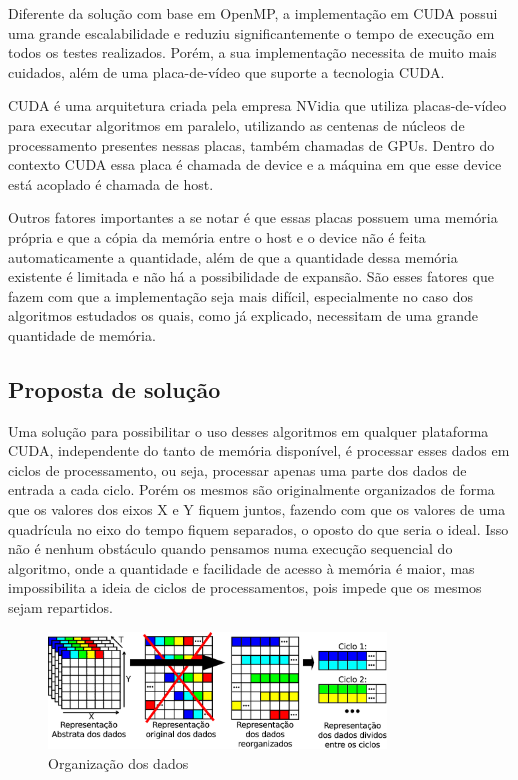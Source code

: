 Diferente da solução com base em OpenMP, a implementação em CUDA \cite{cuda_guide} possui uma grande escalabilidade e reduziu significantemente o tempo de execução em todos os testes realizados. Porém, a sua implementação necessita de muito mais cuidados, além de uma placa-de-vídeo que suporte a tecnologia CUDA.

CUDA é uma arquitetura criada pela empresa NVidia que utiliza placas-de-vídeo para executar algoritmos em paralelo, utilizando as centenas de núcleos de processamento presentes nessas placas, também chamadas de GPUs. Dentro do contexto CUDA essa placa é chamada de device e a máquina em que esse device está acoplado é chamada de host.

Outros fatores importantes a se notar é que essas placas possuem uma memória própria e que a cópia da memória entre o host e o device não é feita automaticamente a quantidade, além de que a quantidade dessa memória existente é limitada e não há a possibilidade de expansão. São esses fatores que fazem com que a implementação seja mais difícil, especialmente no caso dos algoritmos estudados os quais, como já explicado, necessitam de uma grande quantidade de memória.

\subsection{Proposta de solução}\label{cap:proposta_solucao}

Uma solução para possibilitar o uso desses algoritmos em qualquer plataforma CUDA, independente do tanto de memória disponível, é processar esses dados em ciclos de processamento, ou seja, processar apenas uma parte dos dados de entrada a cada ciclo. Porém os mesmos são originalmente organizados de forma que os valores dos eixos X e Y fiquem juntos, fazendo com que os valores de uma quadrícula no eixo do tempo fiquem separados, o oposto do que seria o ideal. Isso não é nenhum obstáculo quando pensamos numa execução sequencial do algoritmo, onde a quantidade e facilidade de acesso à memória é maior, mas impossibilita a ideia de ciclos de processamentos, pois impede que os mesmos sejam repartidos.

\begin{figure}[H]
\centering
\includegraphics[width=0.8\textwidth]{Imagens/organizacao_dados/organizacao_dados.png}
\caption{Organização dos dados}
\label{fig:organizacao_dados_2}
\end{figure}

